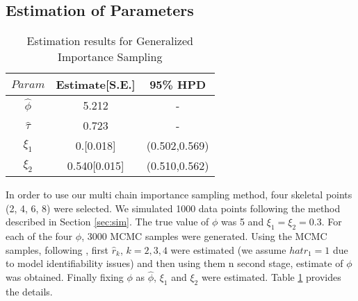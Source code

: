 \documentclass[11pt]{article}
\theoremstyle{remboldstyle}
\begin{document}
\subsection{Estimation of Parameters}
\begin{table}[h]
\caption{Estimation results for Generalized Importance Sampling}
\centering
\begin{tabular}{c c c }
\hline
$Param$      & Estimate[S.E.] & 95\% HPD\\
\hline
$\hat{\phi}$ &  5.212         & -\\
$\hat{\tau}$ &  0.723         & -\\
$\xi_1$      & 0.[0.018]        & (0.502,0.569)\\   
$\xi_2$      & 0.540[0.015]        & (0.510,0.562)\\
  \hline           
\end{tabular}
\label{tab2}
\end{table}
\noindent
In order to use our multi chain importance sampling method, four skeletal points (2, 4, 6, 8) were selected. We simulated 1000 data points following the method described in Section \ref{sec:sim}. The true value of $\phi$ was 5 and $\xi_1 = \xi_2 = 0.3$. For each of the four $\phi$, 3000 MCMC samples were generated. Using the MCMC samples, following \cite{geyer:1994}, first $\hat{r}_k$, $k = 2, 3, 4$ were estimated (we assume $hat{r}_1 = 1$ due to model identifiability issues) and then using them n second stage, estimate of $\phi$ was obtained. Finally fixing $\phi$ as $\hat{\phi}$, $\xi_1$ and $\xi_2$ were estimated. Table \ref{tab2} provides the details.
\end{document}
